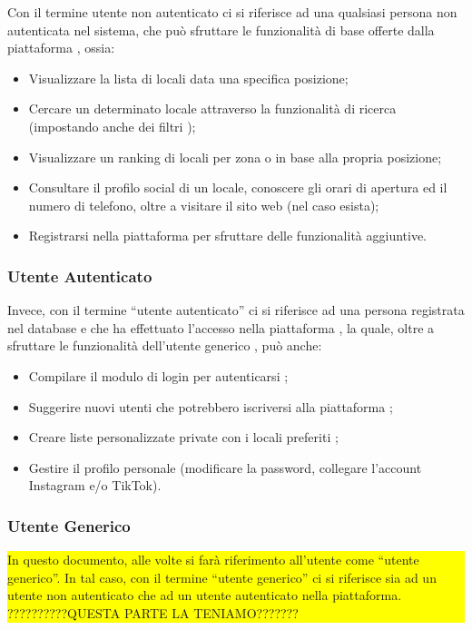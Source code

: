 Con il termine utente non autenticato \glo ci si riferisce ad una qualsiasi persona non autenticata nel sistema, che può sfruttare le funzionalità di base offerte dalla piattaforma \glo, ossia:

\begin{itemize}
  \item Visualizzare la lista di locali \glo data una specifica posizione;
  \item Cercare un determinato locale attraverso la funzionalità di ricerca (impostando anche dei filtri \glo);
  \item Visualizzare un ranking \glo di locali per zona o in base alla propria posizione;
  \item Consultare il profilo \glo social di un locale, conoscere gli orari di apertura ed il numero di telefono, oltre a visitare il sito web (nel caso esista);
  \item Registrarsi nella piattaforma per sfruttare delle funzionalità aggiuntive.
\end{itemize}

\subsubsection{Utente Autenticato}

Invece, con il termine “utente autenticato\glo{}” ci si riferisce ad una persona registrata nel database e che ha effettuato l'accesso nella piattaforma \glo, la quale, oltre a sfruttare le funzionalità dell’utente generico \glo, può anche:

\begin{itemize}
  \item Compilare il modulo di login per autenticarsi \glo{};
  \item Suggerire nuovi utenti \glo che potrebbero iscriversi alla piattaforma \glo{};
  \item Creare liste personalizzate private \glo con i locali preferiti \glo{};
  \item Gestire il profilo personale (modificare la password, collegare l'account Instagram e/o TikTok).
\end{itemize}

\subsubsection{Utente Generico}

\colorbox{yellow}{\parbox{0.99\textwidth}{In questo documento, alle volte si farà riferimento all'utente come “utente generico”. In tal caso, con il termine “utente generico” ci si riferisce sia ad un utente non autenticato che ad un utente autenticato nella piattaforma. ??????????QUESTA PARTE LA TENIAMO???????}}

